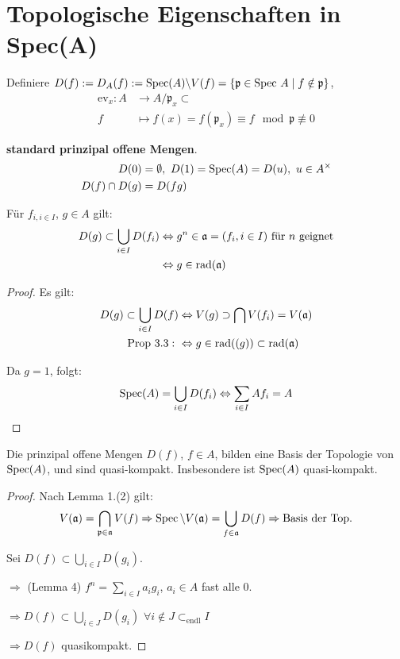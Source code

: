 \section{Topologische Eigenschaften in Spec(A)}

Definiere $D(f):=D_{A}(f):=\operatorname{Spec}(A)\backslash
V(f)=\{\mathfrak{p\in\text{Spec }}A\mid f\notin\mathfrak{p}\}$,
\begin{align*}
  \text{ev}_{x}:A & \longrightarrow A/\mathfrak{p}_{x}\subset\\
  f & \longmapsto f(x)=f(\mathfrak{p}_{x})\equiv f\mod\mathfrak{p}\not\equiv0
\end{align*}

\textbf{standard prinzipal offene Mengen}.
\begin{align*}
  D(0) & =\emptyset,\ D(1)=\operatorname{Spec}(A)=D(u),\ u\in A^{\times}\\
  D(f)\cap D(g) & =D(fg)
\end{align*}

\begin{lem}[4] Für $f_{i,i\in I}$, $g\in A$ gilt:
  \begin{align*}
    D(g)\subset\bigcup_{i\in I}D(f_{i})
    & \Leftrightarrow g^{n}\in\mathfrak{a}=(f_{i},i\in I)\text{ für }n\text{ geignet}\\
    & \Leftrightarrow g\in\operatorname{rad}(\mathfrak{a})
  \end{align*}
\end{lem}
\begin{proof} Es gilt:
  \begin{align*}
    D(g)\subset\bigcup_{i\in I}D(f)
    & \Leftrightarrow V(g)\supset\bigcap V(f_{i})=V(\mathfrak{a})\\
    \text{Prop 3.3}:\ & \Leftrightarrow g\in\operatorname{rad}((g))\subset\operatorname{rad}(\mathfrak{a})
  \end{align*}

  Da $g=1$, folgt:
  \[ \operatorname{Spec}(A)=\bigcup_{i\in I}D(f_{i})\Leftrightarrow\sum_{i\in
      I}Af_{i}=A
  \]
\end{proof}
\begin{prop}[5] Die prinzipal offene Mengen $D(f)$, $f\in A$, bilden
  eine Basis der Topologie von $\operatorname{Spec}(A)$, und sind
  quasi-kompakt. Insbesondere ist $\operatorname{Spec}(A)$ quasi-kompakt.
\end{prop}
\begin{proof} Nach Lemma 1.(2) gilt:
  \[
    V(\mathfrak{a})=\bigcap_{\mathfrak{p}\in\mathfrak{a}}V(f)\Rightarrow\operatorname{Spec}\backslash
    V(\mathfrak{a})=\bigcup_{f\in\mathfrak{a}}D(f)\Rightarrow\text{Basis
      der Top.}
  \]

  Sei $D(f)\subset\bigcup_{i\in I}D(g_{i})$.

  $\Rightarrow$ (Lemma 4) $f^{n}=\sum_{i\in I}a_{i}g_{i}$, $a_{i}\in A$
  fast alle 0.

  $\Rightarrow D(f)\subset\bigcup_{i\in J}D(g_{i})$ $\forall i\notin
  J\subset_{\text{endl}}I$

  $\Rightarrow D(f)$ quasikompakt.
\end{proof}
